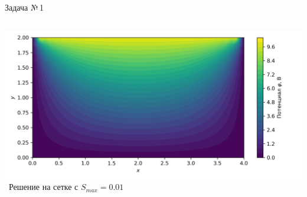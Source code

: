 \documentclass[ignoreonframetext,xcolor=table, unicode, 10pt]{beamer}
\begin{document}
\begin{frame}{Задача №\,1}
\begin{columns}
		\vspace*{-3.5mm}\hspace*{-10mm}
		\centering
		\includegraphics[width=1.2\columnwidth]{rect_dirichlet_only_001_calfem.png}\
		\hspace*{-13mm}Решение на сетке с $S_{max} = 0.01$
	\end{columns}
	
	
	
	\normalsize
	
\end{frame}

%		
	
\end{document}
